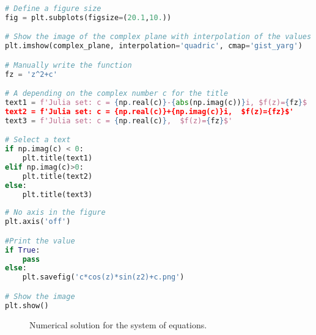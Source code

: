 \documentclass{article}
\begin{document}
\begin{lstlisting}[language = Python, frame = single]
# Define a figure size
fig = plt.subplots(figsize=(20.1,10.))

# Show the image of the complex plane with interpolation of the values
plt.imshow(complex_plane, interpolation='quadric', cmap='gist_yarg')

# Manually write the function
fz = 'z^2+c'

# A depending on the complex number c for the title
text1 = f'Julia set: c = {np.real(c)}-{abs(np.imag(c))}i, $f(z)={fz}$
text2 = f'Julia set: c = {np.real(c)}+{np.imag(c)}i,  $f(z)={fz}$'
text3 = f'Julia set: c = {np.real(c)},  $f(z)={fz}$'

# Select a text 
if np.imag(c) < 0:
    plt.title(text1)
elif np.imag(c)>0:    
    plt.title(text2)
else:
    plt.title(text3)
    
# No axis in the figure
plt.axis('off')

#Print the value 
if True:
    pass
else:
    plt.savefig('c*cos(z)*sin(z2)+c.png')

# Show the image
plt.show()

\end{lstlisting}


\begin{figure}[h]
    \caption{Numerical solution for the system of equations.}
    \label{fig:sol}
\end{figure}


\newpage
\printbibliography[title = {References}]
\end{document}
